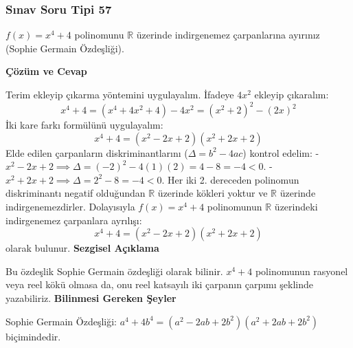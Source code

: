 \documentclass[11pt, a4paper]{article}
\newenvironment{cozum}{
    \vspace{0.5cm}
    \noindent\textcolor{green!60!black}{\faCheckCircle\enspace \textbf{\Large Çözüm ve Cevap}}\par\vspace{0.2cm}
}{}
\newenvironment{sezgisel}{
    \vspace{0.5cm}
    \noindent\textcolor{orange!80!black}{\faLightbulb\enspace \textbf{\Large Sezgisel Açıklama}}\par\vspace{0.2cm}
    \itshape
}{}
\newenvironment{bilgi}{
    \vspace{0.5cm}
    \noindent\textcolor{red!70!black}{\faExclamationTriangle\enspace \textbf{\Large Bilinmesi Gereken Şeyler}}\par\vspace{0.2cm}
}{}
\begin{document}
\subsubsection{Sınav Soru Tipi 57}
\begin{sinavbox}
$f(x) = x^4+4$ polinomunu $\mathbb{R}$ üzerinde indirgenemez çarpanlarına ayırınız (Sophie Germain Özdeşliği).
\end{sinavbox}
\begin{cozum}
Terim ekleyip çıkarma yöntemini uygulayalım. İfadeye $4x^2$ ekleyip çıkaralım:
\[ x^4+4 = (x^4 + 4x^2 + 4) - 4x^2 = (x^2+2)^2 - (2x)^2 \]
İki kare farkı formülünü uygulayalım:
\[ x^4+4 = (x^2 - 2x + 2)(x^2 + 2x + 2) \]
Elde edilen çarpanların diskriminantlarını ($\Delta = b^2-4ac$) kontrol edelim:
- $x^2 - 2x + 2 \implies \Delta = (-2)^2 - 4(1)(2) = 4 - 8 = -4 < 0$.
- $x^2 + 2x + 2 \implies \Delta = 2^2 - 8 = -4 < 0$.
Her iki 2. dereceden polinomun diskriminantı negatif olduğundan $\mathbb{R}$ üzerinde kökleri yoktur ve $\mathbb{R}$ üzerinde indirgenemezdirler.
Dolayısıyla $f(x) = x^4+4$ polinomunun $\mathbb{R}$ üzerindeki indirgenemez çarpanlara ayrılışı:
\[ x^4+4 = (x^2-2x+2)(x^2+2x+2) \]
olarak bulunur.
\end{cozum}
\begin{sezgisel}
Bu özdeşlik Sophie Germain özdeşliği olarak bilinir. $x^4+4$ polinomunun rasyonel veya reel kökü olmasa da, onu reel katsayılı iki çarpanın çarpımı şeklinde yazabiliriz.
\end{sezgisel}
\begin{bilgi}
Sophie Germain Özdeşliği: $a^4 + 4b^4 = (a^2 - 2ab + 2b^2)(a^2 + 2ab + 2b^2)$ biçimindedir.
\end{bilgi}

\newpage
\end{document}
